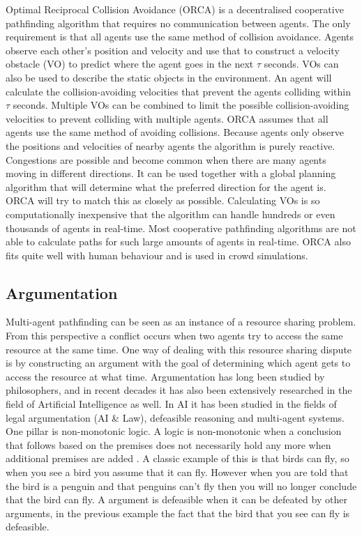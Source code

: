 Optimal Reciprocal Collision Avoidance (ORCA) \cite{vandenberg2011} is a
decentralised cooperative pathfinding algorithm that requires no communication
between agents. The only requirement is that all agents use the same method of
collision avoidance. Agents observe each other's position and velocity and use
that to construct a velocity obstacle (VO) to predict where the agent goes in
the next $\tau$ seconds. VOs can also be used to describe the static objects in
the environment. An agent will calculate the collision-avoiding velocities that
prevent the agents colliding within $\tau$ seconds. Multiple VOs can be
combined to limit the possible collision-avoiding velocities to prevent
colliding with multiple agents. ORCA assumes that all agents use the same
method of avoiding collisions. Because agents only observe the positions and
velocities of nearby agents the algorithm is purely reactive. Congestions are
possible and become common when there are many agents moving in different
directions. It can be used together with a global planning algorithm that will
determine what the preferred direction for the agent is. ORCA will try to
match this as closely as possible. Calculating VOs is so computationally
inexpensive that the algorithm can handle hundreds or even thousands of agents
in real-time. Most cooperative pathfinding algorithms are not able to calculate
paths for such large amounts of agents in real-time. ORCA
also fits quite well with human behaviour and is used in crowd simulations.

\subsection{Argumentation}
Multi-agent pathfinding can be seen as an instance of a resource sharing
problem. From this perspective a conflict occurs when two agents try to access
the same resource at the same time. One way of dealing with this resource
sharing dispute is by constructing an argument with the goal of determining
which agent gets to access the resource at what time. Argumentation has long
been studied by philosophers, and in recent decades it has also been
extensively researched in
the field of Artificial Intelligence as well. In AI it has been studied
in the fields of legal argumentation (AI \& Law), defeasible reasoning and
multi-agent systems. One pillar is non-monotonic logic. A logic is
non-monotonic when a conclusion that follows based on the premises does not
necessarily hold any more when additional premises are added
\cite{vaneemeren2014,modgil2013,rahwan2009}. A classic example of this is that 
birds can
fly, so when
you see a bird you assume that it can fly. However when you are told that the
bird is a penguin and that penguins can't fly then you will no longer conclude
that the bird can fly. A argument is defeasible when it can be defeated by
other arguments, in the previous example the fact that the bird that you see
can fly is defeasible.

